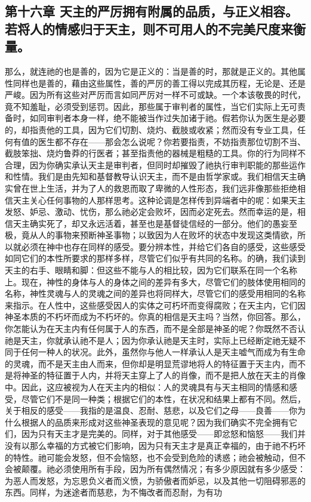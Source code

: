 
\subsection{第十六章 天主的严厉拥有附属的品质，与正义相容。若将人的情感归于天主，则不可用人的不完美尺度来衡量。}

那么，就连祂的也是善的，因为它是正义的：当是善的时，那就是正义的。其他属性同样也是善的，藉由这些属性，善的严厉的善工得以完成其历程，无论是、还是严峻。因为所有这些对严厉而言如同严厉对一样不可或缺。一个本该敬畏的时代，竟不知羞耻，必须受到惩罚。因此，那些属于审判者的属性，当它们实际上无可责备时，如同审判者本身一样，绝不能被当作过失加诸于祂。假若你认为医生是必要的，却指责他的工具，因为它们切割、烧灼、截肢或收紧；然而没有专业工具，任何有值的医生都不存在——那会怎么说呢？你若要指责，不妨指责那位切割不当、截肢笨拙、烧灼鲁莽的行医者；甚至指责他的器械是粗糙的工具。你的行为同样不合理，因为你确实承认天主是审判者，但同时却摧毁了祂执行审判职能的那些运作和性情。我们是由先知和基督教导认识天主，而不是由哲学家或。我们相信天主确实曾在世上生活，并为了人的救恩而取了卑微的人性形态，我们远非像那些拒绝相信天主关心任何事物的人那样思考。这种论调是怎样传到异端者中的呢：如果天主发怒、妒忌、激动、忧伤，那么祂必定会败坏，因而必定死去。然而幸运的是，相信天主确实死了，却又永远活着，甚至也是基督徒信经的一部分。他们的愚妄至极，竟从人的事物来预断神圣事物；以致因为人在败坏的状态中发现这类情欲，所以就必须在神中也存在同样的感受。要分辨本性，并给它们各自的感受，这些感受如同它们的本性所要求的那样多样，尽管它们似乎有共同的名称。的确，我们读到天主的右手、眼睛和脚：但这些不能与人的相比较，因为它们联系在同一个名称上。现在，神性的身体与人的身体之间的差异有多大，尽管它们的肢体使用相同的名称，神性灵魂与人的灵魂之间的差异也将同样大，尽管它们的感受用相同的名称来指示。在人性中，这些感受因人的实体之可朽坏而变得腐败；在天主内，它们因神圣本质的不朽坏而成为不朽坏的。你真的相信是天主吗？当然，你回答。那么，你怎能认为在天主内有任何属于人的东西，而不是全部是神圣的呢？你既然不否认祂是天主，你就承认祂不是人；因为你承认祂是天主时，实际上已经断定祂无疑不同于任何一种人的状况。此外，虽然你与他人一样承认人是天主嘘气而成为有生命的灵魂，而不是天主由人而来，但你却是明显荒谬地将人的特征置于天主内，而不是将神圣的特征置于人内，并将天主穿上了人的肖像，而不是把人放在天主的肖像中。因此，这应被视为人在天主内的相似：人的灵魂具有与天主相同的情感和感受，尽管它们不是同一种类；根据它们的本性，在状况和结果上都有不同。然后，关于相反的感受——我指的是温良、忍耐、慈悲，以及它们之母——良善——你为什么根据人的品质来形成对这些神圣表现的意见呢？因为我们确实不完全拥有它们，因为只有天主才是完美的。同样，对于其他感受——即忿怒和恼怒——我们并没有以那么幸福的方式被它们影响，因为只有天主才是真正幸福的，由于祂不朽坏的特性。祂可能会发怒，但不会恼怒，也不会受到危险的诱惑；祂会被触动，但不会被颠覆。祂必须使用所有手段，因为所有偶然情况；有多少原因就有多少感受：为恶人而发怒，为忘恩负义者而义愤，为骄傲者而妒忌，以及其他一切阻碍邪恶的东西。同样，为迷途者而慈悲，为不悔改者而忍耐，为有功
